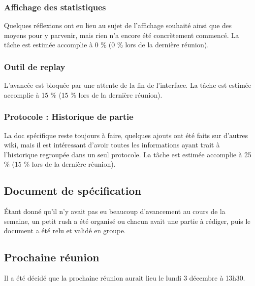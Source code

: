 \documentclass{article}
\newcommand {\accomplished}[2]{La tâche est estimée accomplie à #1 \%
(#2 \% lors de la dernière réunion).}
\begin{document}
\subsubsection*{Affichage des statistiques}
Quelques réflexions ont eu lieu au sujet de l'affichage souhaité ainsi que des
moyens pour y parvenir, mais rien n'a encore été concrètement commencé.
\accomplished{0}{0}

\subsubsection*{Outil de replay}
L'avancée est bloquée par une attente de la fin de l'interface.
\accomplished{15}{15}

\subsubsection*{Protocole : Historique de partie}
La doc spécifique reste toujours à faire, quelques ajouts ont été faits sur
d'autres wiki, mais il est intéressant d'avoir toutes les informations ayant
trait à l'historique regroupée dans un seul protocole.
\accomplished{25}{15}


\subsection*{Document de spécification}
Étant donné qu'il n'y avait pas eu beaucoup d'avancement au cours de la semaine,
un petit rush a été organisé ou chacun avait une partie à rédiger, puis le
document a été relu et validé en groupe.

\subsection*{Prochaine réunion}
Il a été décidé que la prochaine réunion aurait lieu le lundi 3 décembre à
13h30.
\end{document}

